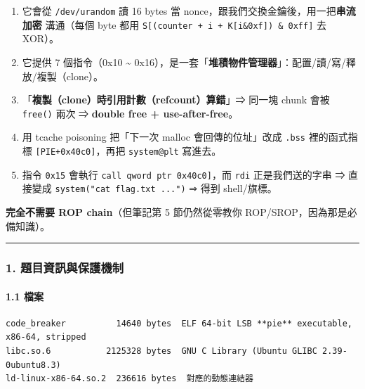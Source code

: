 \documentclass[10pt,a4paper]{article}
\providecommand{\tightlist}{%
  \setlength{\itemsep}{0pt}\setlength{\parskip}{0pt}}
\begin{document}
\begin{enumerate}
\def\labelenumi{\arabic{enumi}.}
\tightlist
\item
  它會從 \texttt{/\allowbreak{}dev/\allowbreak{}urandom} 讀 16 bytes 當
  nonce，跟我們交換金鑰後，用一把\textbf{串流加密} 溝通（每個 byte 都用
  \texttt{S{[}(counter\ \allowbreak{}+\ \allowbreak{}i\ \allowbreak{}+\ \allowbreak{}K{[}i\&\allowbreak{}0xf{]})\ \allowbreak{}\&\allowbreak{}\ \allowbreak{}0xff{]}} 去 XOR）。
\item
  它提供 7 個指令（0x10 \textasciitilde{}
  0x16），是一套「\textbf{堆積物件管理器}」：配置/讀/寫/釋放/複製（clone）。
\item
  「\textbf{複製（clone）時引用計數（refcount）算錯}」⇒ 同一塊 chunk
  會被 \texttt{free()} 兩次 ⇒ \textbf{double free + use-after-free}。
\item
  用 tcache poisoning 把「下一次 malloc 會回傳的位址」改成 \texttt{.\allowbreak{}bss}
  裡的函式指標 \texttt{{[}PIE+0x40c0{]}}，再把 \texttt{system@plt}
  寫進去。
\item
  指令 \texttt{0x15} 會執行 \texttt{call\ \allowbreak{}qword\ \allowbreak{}ptr\ \allowbreak{}{[}0x40c0{]}}，而
  \texttt{rdi} 正是我們送的字串 ⇒ 直接變成
  \texttt{system("cat\ \allowbreak{}flag.\allowbreak{}txt\ \allowbreak{}...")} ⇒ 得到 shell/旗標。
\end{enumerate}

\textbf{完全不需要 ROP chain}（但筆記第 5 節仍然從零教你
ROP/SROP，因為那是必備知識）。

\begin{center}\rule{0.5\linewidth}{0.5pt}\end{center}

\subsubsection{1.
題目資訊與保護機制}\label{ux984cux76eeux8cc7ux8a0aux8207ux4fddux8b77ux6a5fux5236}

\paragraph{1.1 檔案}\label{ux6a94ux6848}

\begin{Verbatim}[breaklines=true,breakanywhere=true,breakautoindent=false,fontsize=\fontsize{7.0}{9.5}\selectfont]
code_breaker          14640 bytes  ELF 64-bit LSB **pie** executable, x86-64, stripped
libc.so.6           2125328 bytes  GNU C Library (Ubuntu GLIBC 2.39-0ubuntu8.3)
ld-linux-x86-64.so.2  236616 bytes  對應的動態連結器
\end{Verbatim}
\end{document}
